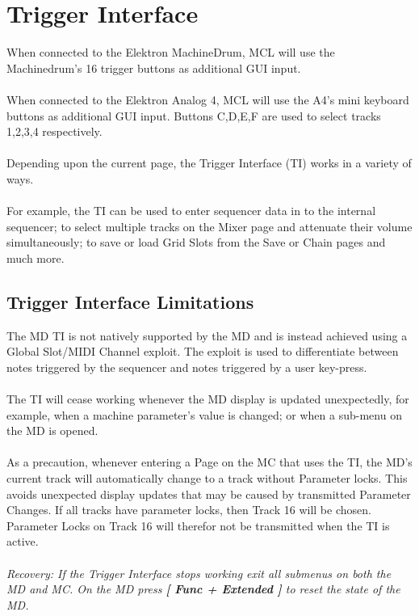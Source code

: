 \chapter{Trigger Interface}
When connected to the Elektron MachineDrum, MCL will use the Machinedrum's 16 trigger buttons as additional GUI input. \\
\\
When connected to the Elektron Analog 4, MCL will use the A4's mini keyboard buttons as additional GUI input. Buttons C,D,E,F are used to select tracks 1,2,3,4 respectively.\\
\\
Depending upon the current page, the Trigger Interface (TI) works in a variety of ways.\\
\\For example, the TI can be used to enter sequencer data in to the internal sequencer;
to select multiple tracks on the Mixer page and attenuate their volume simultaneously; to save or load Grid Slots from the Save or Chain pages and much more.

\section{Trigger Interface Limitations}
The MD TI is not natively supported by the MD and is instead achieved using a Global Slot/MIDI Channel exploit. The exploit is used to differentiate between notes triggered by the sequencer and notes triggered by a user key-press.\\
\\
The TI will cease working whenever the MD display is updated unexpectedly, for example, when a machine parameter's value is changed; or when a sub-menu on the MD is opened.\\
\\
As a precaution, whenever entering a Page on the MC that uses the TI, the MD's current track will automatically change to a track without Parameter locks. This avoids unexpected display updates that may be caused by transmitted Parameter Changes. If all tracks have parameter locks, then Track 16 will be chosen. Parameter Locks on Track 16 will therefor not be transmitted when the TI is active.\\
\\
\textit{Recovery: If the Trigger Interface stops working exit all submenus on both the MD and MC. On the MD press \textbf{[ Func + Extended ]} to reset the state of the MD.}
